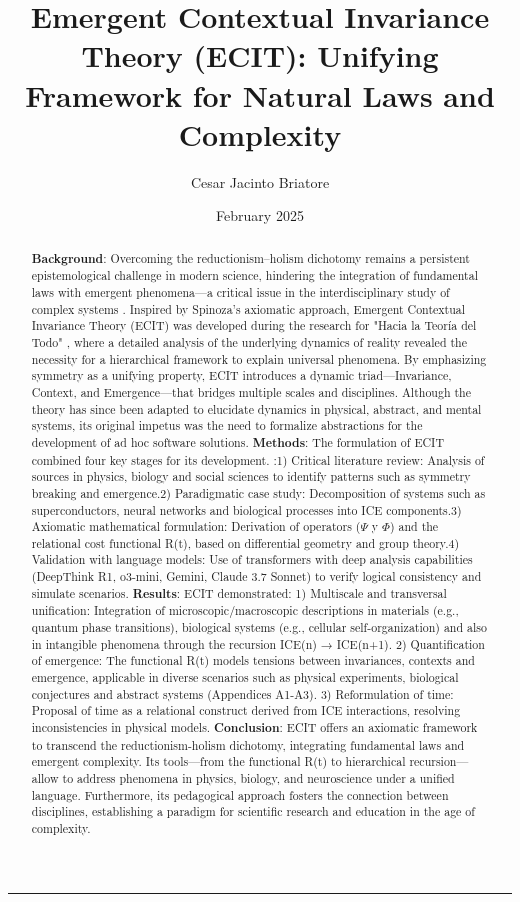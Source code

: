 \documentclass{article}
\title{Emergent Contextual Invariance Theory (ECIT): Unifying Framework for Natural Laws and Complexity}
\author{Cesar Jacinto Briatore}
\date{February 2025}
\begin{document}
\maketitle
\noindent\rule{\linewidth}{1pt}

\begin{abstract}
\textbf{Background}: Overcoming the reductionism–holism dichotomy remains a persistent epistemological challenge in modern science, hindering the integration of fundamental laws with emergent phenomena—a critical issue in the interdisciplinary study of complex systems \cite{Mitchell2009}. Inspired by Spinoza’s axiomatic approach, Emergent Contextual Invariance Theory (ECIT) was developed during the research for "Hacia la Teoría del Todo" \cite{Briatore2025}, where a detailed analysis of the underlying dynamics of reality revealed the necessity for a hierarchical framework to explain universal phenomena. By emphasizing symmetry as a unifying property, ECIT introduces a dynamic triad—Invariance, Context, and Emergence—that bridges multiple scales and disciplines. Although the theory has since been adapted to elucidate dynamics in physical, abstract, and mental systems, its original impetus was the need to formalize abstractions for the development of ad hoc software solutions. \textbf{Methods}: The formulation of ECIT combined four key stages for its development. :1) Critical literature review: Analysis of sources in physics, biology and social sciences to identify patterns such as symmetry breaking and emergence.2) Paradigmatic case study: Decomposition of systems such as superconductors, neural networks and biological processes into ICE components.3) Axiomatic mathematical formulation: Derivation of operators (\texorpdfstring{$\Psi$ y $\Phi$}{Psi y Phi}) and the relational cost functional R(t), based on differential geometry and group theory.4) Validation with language models: Use of transformers with deep analysis capabilities (DeepThink R1, o3-mini, Gemini, Claude 3.7 Sonnet) to verify logical consistency and simulate scenarios. \textbf{Results}: ECIT demonstrated: 1) Multiscale and transversal unification: Integration of microscopic/macroscopic descriptions in materials (e.g., quantum phase transitions), biological systems (e.g., cellular self-organization) and also in intangible phenomena through the recursion ICE(n) → ICE(n+1). 2) Quantification of emergence: The functional R(t) models tensions between invariances, contexts and emergence, applicable in diverse scenarios such as physical experiments, biological conjectures and abstract systems (Appendices A1-A3). 3) Reformulation of time: Proposal of time as a relational construct derived from ICE interactions, resolving inconsistencies in physical models. \textbf{Conclusion}: ECIT offers an axiomatic framework to transcend the reductionism-holism dichotomy, integrating fundamental laws and emergent complexity. Its tools—from the functional R(t) to hierarchical recursion—allow to address phenomena in physics, biology, and neuroscience under a unified language. Furthermore, its pedagogical approach fosters the connection between disciplines, establishing a paradigm for scientific research and education in the age of complexity.


\end{abstract}
\end{document}
